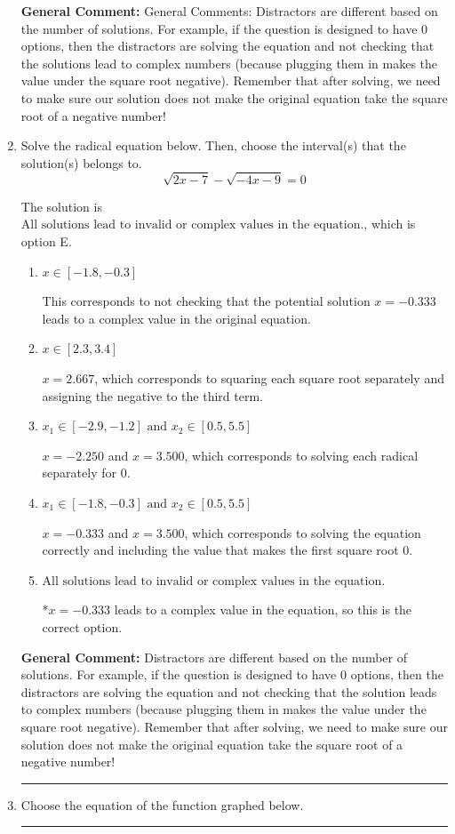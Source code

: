 \documentclass{extbook}[14pt]
\newcommand{\litem}[1]{\item #1

\rule{\textwidth}{0.4pt}}
\begin{document}
\begin{enumerate}
{\textbf{General Comment:} General Comments: Distractors are different based on the number of solutions. For example, if the question is designed to have 0 options, then the distractors are solving the equation and not checking that the solutions lead to complex numbers (because plugging them in makes the value under the square root negative). Remember that after solving, we need to make sure our solution does not make the original equation take the square root of a negative number!
}
\litem{
Solve the radical equation below. Then, choose the interval(s) that the solution(s) belongs to.
\[ \sqrt{2 x - 7} - \sqrt{-4 x - 9} = 0 \]

The solution is \( \text{All solutions lead to invalid or complex values in the equation.} \), which is option E.\begin{enumerate}[label=\Alph*.]
\item \( x \in [-1.8,-0.3] \)

This corresponds to not checking that the potential solution $x = -0.333$ leads to a complex value in the original equation.
\item \( x \in [2.3,3.4] \)

$x = 2.667$, which corresponds to squaring each square root separately and assigning the negative to the third term.
\item \( x_1 \in [-2.9, -1.2] \text{ and } x_2 \in [0.5,5.5] \)

$x = -2.250$ and $x = 3.500$, which corresponds to solving each radical separately for 0.
\item \( x_1 \in [-1.8, -0.3] \text{ and } x_2 \in [0.5,5.5] \)

$x = -0.333$ and $x = 3.500$, which corresponds to solving the equation correctly and including the value that makes the first square root 0.
\item \( \text{All solutions lead to invalid or complex values in the equation.} \)

*$x = -0.333$ leads to a complex value in the equation, so this is the correct option.
\end{enumerate}

\textbf{General Comment:} Distractors are different based on the number of solutions. For example, if the question is designed to have 0 options, then the distractors are solving the equation and not checking that the solution leads to complex numbers (because plugging them in makes the value under the square root negative). Remember that after solving, we need to make sure our solution does not make the original equation take the square root of a negative number!
}
\litem{
Choose the equation of the function graphed below.

}
\end{enumerate}
\end{document}
